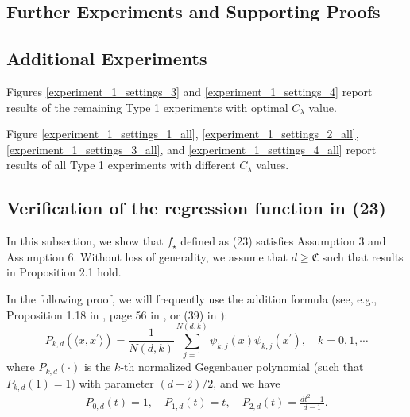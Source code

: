 \documentclass{article}
\theoremstyle{plain}
\theoremstyle{definition}
\theoremstyle{remark}
\begin{document}
\begin{appendix}
\section{Further Experiments and Supporting Proofs}\label{appendix_experiments}

\subsection{Additional Experiments}\label{appendix_addtional_experiments}

Figures \ref{experiment_1_settings_3} and \ref{experiment_1_settings_4} report results of the remaining Type 1 experiments with optimal $C_{\lambda}$ value.


Figure \ref{experiment_1_settings_1_all}, \ref{experiment_1_settings_2_all}, \ref{experiment_1_settings_3_all}, and \ref{experiment_1_settings_4_all} report results of all Type 1 experiments with different $C_{\lambda}$ values.


\subsection{Verification of the regression function in (23)}\label{append_proof_true_function_in_experiments}

In this subsection, we show that $f_{\star}$ defined as (23) satisfies Assumption 3 and Assumption 6. Without loss of generality, we assume that $d \geq \mathfrak{C}$ such that results in Proposition 2.1 hold.

In the following proof, we will frequently use the addition formula (see, e.g., Proposition 1.18 in \cite{gallier2009notes}, page 56 in \cite{ghorbani2021linearized}, or (39) in \cite{lu2024pinsker}):
\begin{equation}\label{eqn_addition_formula}
    P_{k, d}(\langle x, x^{\prime}\rangle) = \frac{1}{N(d, k)} \sum_{j=1}^{N(d, k)} \psi_{k,j}(x) \psi_{k,j}(x^{\prime}),\quad k=0, 1, \cdots
\end{equation}
where $P_{k, d}(\cdot)$ is the $k$-th normalized Gegenbauer polynomial (such that $P_{k, d}(1)=1$) with parameter $(d-2)/2$, and we have
\begin{equation}\label{eqn_former_gegenbauer}
    \begin{aligned}
    P_{0, d}(t)=1, \quad P_{1, d}(t)=t, \quad P_{2, d}(t)=\frac{dt^2-1}{d-1}.
    \end{aligned}
\end{equation}




\end{appendix}
\end{document}
